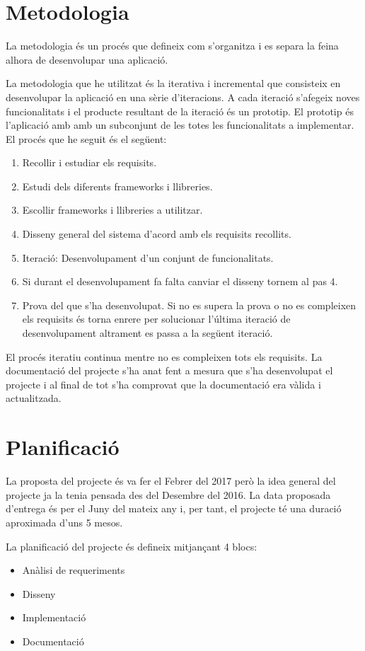 \documentclass[12pt, titlepage]{article}
\begin{document}
\section{Metodologia}

La metodologia és un procés que defineix com s'organitza i es separa la feina alhora
de desenvolupar una aplicació.

La metodologia que he utilitzat és la iterativa i incremental que consisteix en desenvolupar
la aplicació en una sèrie d'iteracions. A cada iteració s'afegeix noves funcionalitats i
el producte resultant de la iteració és un prototip. El prototip és l'aplicació amb
amb un subconjunt de les totes les funcionalitats a implementar. El procés que he
seguit és el següent:

\begin{enumerate}
\item Recollir i estudiar els requisits.
\item Estudi dels diferents frameworks i llibreries.
\item Escollir frameworks i llibreries a utilitzar.
\item Disseny general del sistema d'acord amb els requisits recollits.
\item Iteració: Desenvolupament d'un conjunt de funcionalitats.
\item Si durant el desenvolupament fa falta canviar el disseny tornem al pas 4.
\item Prova del que s'ha desenvolupat. Si no es supera la prova o no es compleixen
els requisits és torna enrere per solucionar l'última iteració de desenvolupament
altrament es passa a la següent iteració.
\end{enumerate}

El procés iteratiu continua mentre no es compleixen tots els requisits. La
documentació del projecte s'ha anat fent a mesura que s'ha desenvolupat el projecte
i al final de tot s'ha comprovat que la documentació era vàlida i actualitzada.


\section{Planificació}

La proposta del projecte és va fer el Febrer del 2017 però la idea
general del projecte ja la tenia pensada des del Desembre del 2016. La data
proposada d'entrega és per el Juny del mateix any i, per tant, el projecte
té una duració aproximada d'uns 5 mesos.

La planificació del projecte és defineix mitjançant 4 blocs:
\begin{itemize}
\item Anàlisi de requeriments
\item Disseny
\item Implementació
\item Documentació
\end{itemize}
\end{document}
